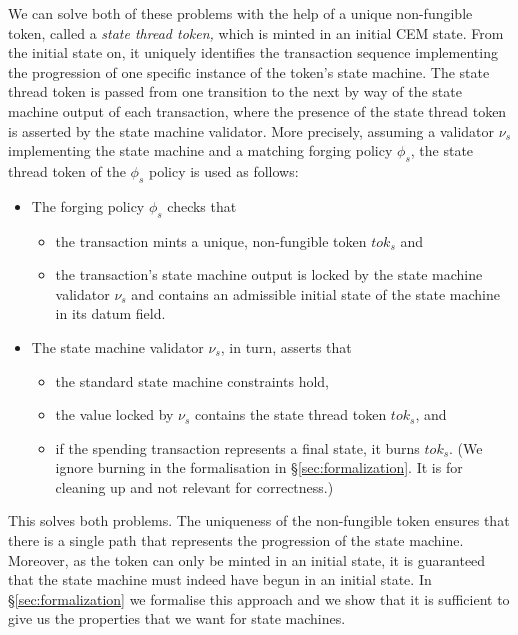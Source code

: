 We can solve both of these problems with the help of a unique
non-fungible token, called a \emph{state thread token,} which
is minted in an initial CEM state. From the initial state on, it uniquely identifies the transaction
sequence implementing the progression of one specific instance of the token's
state machine.
The state thread token is passed from one transition to the next by
way of the state machine output of each transaction, where the
presence of the state thread token is asserted by the state machine
validator. More precisely, assuming a validator $\nu_s$ implementing
the state machine and a matching forging policy $\phi_s$, the
state thread token of the $\phi_s$ policy is used as follows:
%
\begin{itemize}

\item The forging policy $\phi_s$ checks that
\begin{itemize}
\item the transaction mints a unique, non-fungible token $\mathit{tok}_s$ and
\item the transaction's state machine output is locked by the state machine validator $\nu_s$ and contains an admissible initial state of the state machine in its datum field.
\end{itemize}

\item The state machine validator $\nu_s$, in turn, asserts that
\begin{itemize}
\item the standard state machine constraints hold,
\item the value locked by $\nu_s$ contains the state thread token $\mathit{tok}_s$, and
\item if the spending transaction represents a final state, it burns $\mathit{tok}_s$.
(We ignore burning in the formalisation in \S\ref{sec:formalization}. It is for cleaning up and not relevant for correctness.)
\end{itemize}
\end{itemize}

This solves both problems. The uniqueness of the non-fungible token ensures that there is a single path that represents the progression of the state machine. Moreover, as the token can only be minted in an initial state, it is guaranteed that the state machine must indeed have begun in an initial state. In \S\ref{sec:formalization} we formalise this approach and we show that it is sufficient to give us the properties that we want for state machines.

